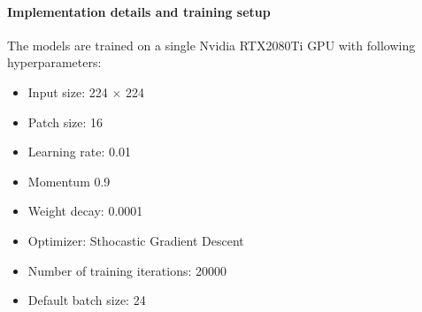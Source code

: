 \documentclass{IEEEtran}
\begin{document}
\paragraph{Implementation details and training setup}
The models are trained on a single Nvidia RTX2080Ti GPU with following hyperparameters:
\begin{itemize}
    \item Input size: 224 $\times$ 224
    \item Patch size: 16
    \item Learning rate: 0.01
    \item Momentum 0.9 
    \item Weight decay: 0.0001
    \item Optimizer: Sthocastic Gradient Descent
    \item Number of training iterations: 20000
    \item Default batch size: 24
\end{itemize}



\clearpage
\printbibliography{}
\end{document}
